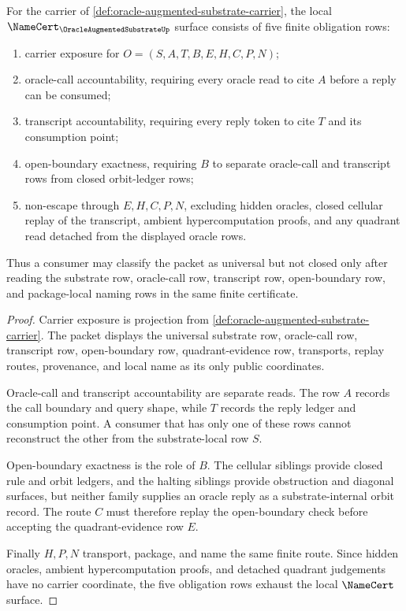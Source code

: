 \begin{theorem}
\label{thm:oracle-augmented-substrate-namecert-obligations}
For the carrier of \autoref{def:oracle-augmented-substrate-carrier}, the local $\NameCert_{\OracleAugmentedSubstrateUp}$ surface consists of five finite obligation rows:
\begin{enumerate}
\item carrier exposure for $O=(S,A,T,B,E,H,C,P,N)$;
\item oracle-call accountability, requiring every oracle read to cite $A$ before a reply can be consumed;
\item transcript accountability, requiring every reply token to cite $T$ and its consumption point;
\item open-boundary exactness, requiring $B$ to separate oracle-call and transcript rows from closed orbit-ledger rows;
\item non-escape through $E,H,C,P,N$, excluding hidden oracles, closed cellular replay of the transcript, ambient hypercomputation proofs, and any quadrant read detached from the displayed oracle rows.
\end{enumerate}
Thus a consumer may classify the packet as universal but not closed only after reading the substrate row, oracle-call row, transcript row, open-boundary row, and package-local naming rows in the same finite certificate.
\end{theorem}
\begin{proof}
Carrier exposure is projection from \autoref{def:oracle-augmented-substrate-carrier}. The packet displays the universal substrate row, oracle-call row, transcript row, open-boundary row, quadrant-evidence row, transports, replay routes, provenance, and local name as its only public coordinates.

Oracle-call and transcript accountability are separate reads. The row $A$ records the call boundary and query shape, while $T$ records the reply ledger and consumption point. A consumer that has only one of these rows cannot reconstruct the other from the substrate-local row $S$.

Open-boundary exactness is the role of $B$. The cellular siblings provide closed rule and orbit ledgers, and the halting siblings provide obstruction and diagonal surfaces, but neither family supplies an oracle reply as a substrate-internal orbit record. The route $C$ must therefore replay the open-boundary check before accepting the quadrant-evidence row $E$.

Finally $H,P,N$ transport, package, and name the same finite route. Since hidden oracles, ambient hypercomputation proofs, and detached quadrant judgements have no carrier coordinate, the five obligation rows exhaust the local $\NameCert$ surface.
\end{proof}

